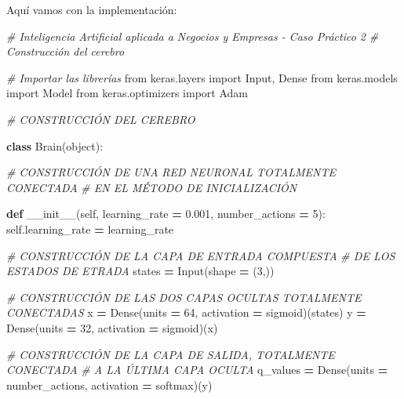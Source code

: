 \documentclass[
]{book}
\newenvironment{Shaded}{\begin{snugshade}}{\end{snugshade}}
\newcommand{\BuiltInTok}[1]{#1}
\newcommand{\CommentTok}[1]{\textcolor[rgb]{0.56,0.35,0.01}{\textit{#1}}}
\newcommand{\DecValTok}[1]{\textcolor[rgb]{0.00,0.00,0.81}{#1}}
\newcommand{\FloatTok}[1]{\textcolor[rgb]{0.00,0.00,0.81}{#1}}
\newcommand{\FunctionTok}[1]{\textcolor[rgb]{0.00,0.00,0.00}{#1}}
\newcommand{\ImportTok}[1]{#1}
\newcommand{\KeywordTok}[1]{\textcolor[rgb]{0.13,0.29,0.53}{\textbf{#1}}}
\newcommand{\NormalTok}[1]{#1}
\newcommand{\OperatorTok}[1]{\textcolor[rgb]{0.81,0.36,0.00}{\textbf{#1}}}
\newcommand{\StringTok}[1]{\textcolor[rgb]{0.31,0.60,0.02}{#1}}
\newcommand{\VariableTok}[1]{\textcolor[rgb]{0.00,0.00,0.00}{#1}}
\begin{document}
Aquí vamos con la implementación:\\

\begin{Shaded}
\begin{Highlighting}[]
\CommentTok{\# Inteligencia Artificial aplicada a Negocios y Empresas {-} Caso Práctico 2}
\CommentTok{\# Construcción del cerebro}

\CommentTok{\# Importar las librerías}
\ImportTok{from}\NormalTok{ keras.layers }\ImportTok{import}\NormalTok{ Input, Dense}
\ImportTok{from}\NormalTok{ keras.models }\ImportTok{import}\NormalTok{ Model}
\ImportTok{from}\NormalTok{ keras.optimizers }\ImportTok{import}\NormalTok{ Adam}

\CommentTok{\# CONSTRUCCIÓN DEL CEREBRO}

\KeywordTok{class}\NormalTok{ Brain(}\BuiltInTok{object}\NormalTok{):}
    
    \CommentTok{\# CONSTRUCCIÓN DE UNA RED NEURONAL TOTALMENTE CONECTADA }
    \CommentTok{\# EN EL MÉTODO DE INICIALIZACIÓN}
    
    \KeywordTok{def} \FunctionTok{\_\_init\_\_}\NormalTok{(}\VariableTok{self}\NormalTok{, learning\_rate }\OperatorTok{=} \FloatTok{0.001}\NormalTok{, number\_actions }\OperatorTok{=} \DecValTok{5}\NormalTok{):}
        \VariableTok{self}\NormalTok{.learning\_rate }\OperatorTok{=}\NormalTok{ learning\_rate}
        
        \CommentTok{\# CONSTRUCCIÓN DE LA CAPA DE ENTRADA COMPUESTA }
        \CommentTok{\# DE LOS ESTADOS DE ETRADA}
\NormalTok{        states }\OperatorTok{=}\NormalTok{ Input(shape }\OperatorTok{=}\NormalTok{ (}\DecValTok{3}\NormalTok{,))}
        
        \CommentTok{\# CONSTRUCCIÓN DE LAS DOS CAPAS OCULTAS TOTALMENTE CONECTADAS}
\NormalTok{        x }\OperatorTok{=}\NormalTok{ Dense(units }\OperatorTok{=} \DecValTok{64}\NormalTok{, activation }\OperatorTok{=} \StringTok{\textquotesingle{}sigmoid\textquotesingle{}}\NormalTok{)(states)}
\NormalTok{        y }\OperatorTok{=}\NormalTok{ Dense(units }\OperatorTok{=} \DecValTok{32}\NormalTok{, activation }\OperatorTok{=} \StringTok{\textquotesingle{}sigmoid\textquotesingle{}}\NormalTok{)(x)}
        
        \CommentTok{\# CONSTRUCCIÓN DE LA CAPA DE SALIDA, TOTALMENTE CONECTADA }
        \CommentTok{\# A LA ÚLTIMA CAPA OCULTA}
\NormalTok{        q\_values }\OperatorTok{=}\NormalTok{ Dense(units }\OperatorTok{=}\NormalTok{ number\_actions, activation }\OperatorTok{=} \StringTok{\textquotesingle{}softmax\textquotesingle{}}\NormalTok{)(y)}
        

\end{Highlighting}
\end{Shaded}
\end{document}
